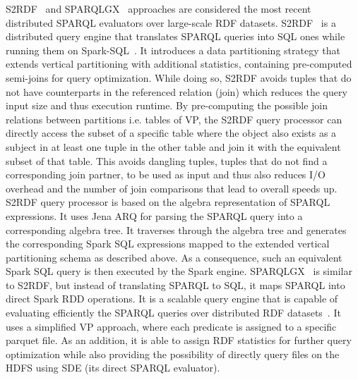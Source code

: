 S2RDF~\cite{Schatzle:2016:SRQ:2977797.2977806} and SPARQLGX~\cite{sparqlgx-iswc-2016} approaches are considered the most recent distributed \gls{SPARQL} evaluators over large-scale \gls{RDF} datasets.
S2RDF~\cite{Schatzle:2016:SRQ:2977797.2977806} is a distributed query engine that translates \gls{SPARQL} queries into SQL ones while running them on Spark-SQL~\cite{Armbrust2015SSR}. 
It introduces a data partitioning strategy that extends vertical partitioning with additional statistics, containing pre-computed semi-joins for query optimization.
While doing so, S2RDF avoids tuples that do not have counterparts in the referenced relation (join) which reduces the query input size and thus execution runtime.
By pre-computing the possible join relations between partitions i.e. tables of \gls{VP}, the S2RDF query processor can directly access the subset of a specific table where the object also exists as a subject in at least one tuple in the other table and join it with the equivalent subset of that table.
This avoids dangling tuples, tuples that do not find a corresponding join partner, to be used as input and thus also reduces I/O overhead and the number of join comparisons that lead to overall speeds up.
S2RDF query processor is based on the algebra representation of \gls{SPARQL} expressions. 
It uses Jena ARQ for parsing the \gls{SPARQL} query into a corresponding algebra tree.
It traverses through the algebra tree and generates the corresponding Spark SQL expressions mapped to the extended vertical partitioning schema as described above.
As a consequence, such an equivalent Spark SQL query is then executed by the Spark engine.
SPARQLGX~\cite{sparqlgx-iswc-2016} is similar to S2RDF, but instead of translating \gls{SPARQL} to SQL, it maps \gls{SPARQL} into direct Spark \gls{RDD} operations. 
It is a scalable query engine that is capable of evaluating efficiently the \gls{SPARQL} queries over distributed \gls{RDF} datasets~\cite{graux2018multi}.
It uses a simplified \gls{VP} approach, where each predicate is assigned to a specific parquet file. 
As an addition, it is able to assign \gls{RDF} statistics for further query optimization while also providing the possibility of directly query files on the \gls{HDFS} using SDE (its direct \gls{SPARQL} evaluator).

